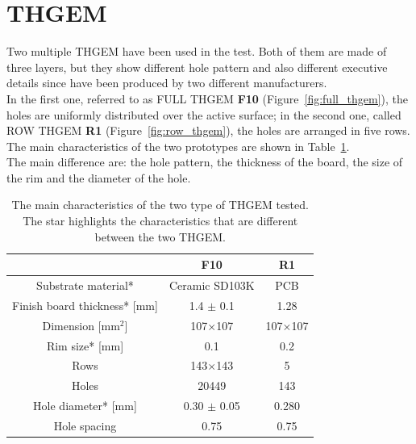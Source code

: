 \documentclass[a4paper, 11 pt]{report}
\begin{document}
\section{THGEM}
Two multiple THGEM have been used in the test. Both of them are made of three layers, but they show 
different hole pattern and also different executive details since have been produced by two 
different manufacturers.\\
In the first one, referred to as FULL THGEM \textbf{F10} (Figure~\ref{fig:full_thgem}), the holes 
are uniformly distributed over the active surface; in the second one, called ROW THGEM \textbf{R1} 
(Figure~\ref{fig:row_thgem}), the holes are arranged in five rows.\\
The main characteristics of the two prototypes are shown in Table~\ref{tab:thgem}.\\
The main difference are: the hole pattern, the thickness of the board, the size of the 
rim and the diameter of the hole.
\begin{table} [h!]
   \begin{center}
   \renewcommand{\arraystretch}{1.2}
      \begin{tabular}{|c|c|c|}
        \hline 
		& \textbf{F10} 	& \textbf{R1} \\ 
        \hline 
        Substrate material*			 & Ceramic SD103K 	& PCB  \\ 
        \hline 
        Finish board thickness* [mm] & 1.4 $\pm$ 0.1 	& 1.28 \\ 
        \hline 
        Dimension [$\mbox{mm}^2$] 	 & 107$\times$107 	& 107$\times$107 \\ 
        \hline 
        Rim size* [mm] 				 & 0.1 				& 0.2  \\ 
        \hline  
        Rows 						 & 143$\times$143 	& 5 \\ 
        \hline 
        Holes 						 & 20449 			& 143 \\ 
        \hline 
        Hole diameter* [mm] 		 & 0.30 $\pm$ 0.05 	& 0.280 \\ 
        \hline
        Hole spacing 				 & 0.75 			& 0.75 \\ 
        \hline
      \end{tabular} 
   \end{center}
   \caption{The main characteristics of the two type of THGEM tested. The star highlights
   the characteristics that are different between the two THGEM.} \label{tab:thgem}
\end{table}
\end{document}
